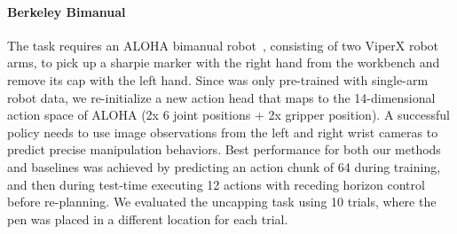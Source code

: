 \begin{appendices}
\paragraph{Berkeley Bimanual} The task requires an ALOHA bimanual robot~\cite{zhao2023learning}, consisting of two ViperX robot arms, to pick up a sharpie marker with the right hand from the workbench and remove its cap with the left hand. Since \method{} was only pre-trained with single-arm robot data, we re-initialize a new action head that maps to the 14-dimensional action space of ALOHA (2x 6 joint positions + 2x gripper position). A successful policy needs to use image observations from the left and right wrist cameras to predict precise manipulation behaviors. Best performance for both our methods and baselines was achieved by predicting an action chunk of 64 during training, and then during test-time executing 12 actions with receding horizon control before re-planning. We evaluated the uncapping task using 10 trials, where the pen was placed in a different location for each trial.




\end{appendices}
